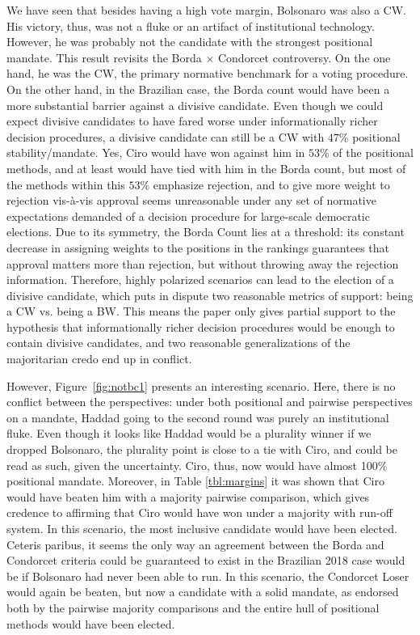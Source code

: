 \documentclass[hidelinks,11pt]{article} \usepackage[utf8]{inputenc}
\begin{document}
    We have seen that besides having a high vote margin, Bolsonaro was also a
    CW. His victory, thus, was not a fluke or an artifact of institutional
    technology. However, he was probably not the candidate with the strongest
    positional mandate. This result revisits the Borda \(\times\) Condorcet
    controversy. On the one hand, he was the CW, the primary normative benchmark
    for a voting procedure. On the other hand, in the Brazilian case, the Borda
    count would have been a more substantial barrier against a divisive
    candidate. Even though we could expect divisive candidates to have fared
    worse under informationally richer decision procedures, a divisive candidate
    can still be a CW with \(47\%\) positional stability/mandate. Yes, Ciro
    would have won against him in \(53\%\) of the positional methods, and at
    least would have tied with him in the Borda count, but most of the methods
    within this \(53\%\) emphasize rejection, and to give more weight to
    rejection vis-\`a-vis approval seems unreasonable under any set of normative
    expectations demanded of a decision procedure for large-scale democratic
    elections. Due to its symmetry, the Borda Count lies at a threshold: its
    constant decrease in assigning weights to the positions in the rankings
    guarantees that approval matters more than rejection, but without throwing
    away the rejection information. Therefore, highly polarized scenarios can
    lead to the election of a divisive candidate, which puts in dispute two
    reasonable metrics of support: being a CW vs. being a BW. This means the
    paper only gives partial support to the hypothesis that informationally
    richer decision procedures would be enough to contain divisive candidates,
    and two reasonable generalizations of the majoritarian credo end up in
    conflict.

    However, Figure~\ref{fig:notbc1} presents an interesting scenario. Here,
    there is no conflict between the perspectives: under both positional and
    pairwise perspectives on a mandate, Haddad going to the second round was
    purely an institutional fluke. Even though it looks like Haddad would be a
    plurality winner if we dropped Bolsonaro, the plurality point is close to a
    tie with Ciro, and could be read as such, given the uncertainty. Ciro, thus,
    now would have almost 100\(\%\) positional mandate. Moreover, in Table
    \ref{tbl:margins} it was shown that Ciro would have beaten him with a
    majority pairwise comparison, which gives credence to affirming that Ciro
    would have won under a majority with run-off system. In this scenario, the
    most inclusive candidate would have been elected. Ceteris paribus, it seems
    the only way an agreement between the Borda and Condorcet criteria could be
    guaranteed to exist in the Brazilian 2018 case would be if Bolsonaro had
    never been able to run. In this scenario, the Condorcet Loser would again be
    beaten, but now a candidate with a solid mandate, as endorsed both by the
    pairwise majority comparisons and the entire hull of positional methods
    would have been elected.
\end{document}

